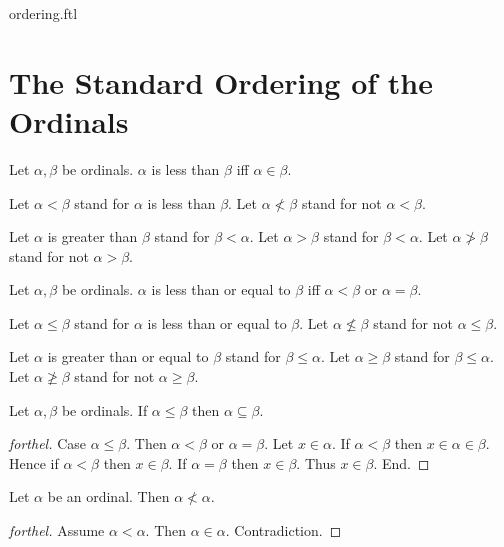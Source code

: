 \documentclass{naproche-library}
\begin{document}
\begin{smodule}{ordering.ftl}

  \section*{The Standard Ordering of the Ordinals}

  \begin{definition}[forthel,id=SET_THEORY_02_6654252130762752]
    Let $\alpha, \beta$ be ordinals.
    $\alpha$ is less than $\beta$ iff $\alpha \in \beta$.

    Let $\alpha < \beta$ stand for $\alpha$ is less than $\beta$.
    Let $\alpha \nless \beta$ stand for not $\alpha < \beta$.

    Let $\alpha$ is greater than $\beta$ stand for $\beta < \alpha$.
    Let $\alpha > \beta$ stand for $\beta < \alpha$.
    Let $\alpha \ngtr \beta$ stand for not $\alpha > \beta$.
  \end{definition}

  \begin{definition}[forthel,id=SET_THEORY_02_2639956210089984]
    Let $\alpha, \beta$ be ordinals.
    $\alpha$ is less than or equal to $\beta$ iff $\alpha < \beta$ or $\alpha = \beta$.

    Let $\alpha \leq \beta$ stand for $\alpha$ is less than or equal to $\beta$.
    Let $\alpha \nleq \beta$ stand for not $\alpha \leq \beta$.

    Let $\alpha$ is greater than or equal to $\beta$ stand for $\beta \leq \alpha$.
    Let $\alpha \geq \beta$ stand for $\beta \leq \alpha$.
    Let $\alpha \ngeq \beta$ stand for not $\alpha \geq \beta$.
  \end{definition}

  \begin{proposition}[forthel,id=SET_THEORY_02_3089369577553920]
    Let $\alpha, \beta$ be ordinals.
    If $\alpha \leq \beta$ then $\alpha \subseteq \beta$.
  \end{proposition}
  \begin{proof}[forthel]
    Case $\alpha \leq \beta$.
      Then $\alpha < \beta$ or $\alpha = \beta$.
      Let $x \in \alpha$.
      If $\alpha < \beta$ then $x \in \alpha \in \beta$.
      Hence if $\alpha < \beta$ then $x \in \beta$.
      If $\alpha = \beta$ then $x \in \beta$.
      Thus $x \in \beta$.
    End.
  \end{proof}

  \begin{proposition}[forthel,id=SET_THEORY_02_6229364135952384]
    Let $\alpha$ be an ordinal.
    Then $\alpha \nless \alpha$.
  \end{proposition}
  \begin{proof}[forthel]
    Assume $\alpha < \alpha$.
    Then $\alpha \in \alpha$.
    Contradiction.
  \end{proof}


\end{smodule}
\end{document}
